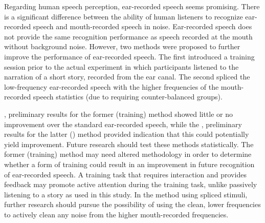 Regarding human speech perception, ear-recorded speech seems promising.  There is a significant difference between the ability of human listeners to recognize ear-recorded speech and mouth-recorded speech in noise.  Ear-recorded speech does not provide the same recognition performance as speech recorded at the mouth without background noise.  However, two methods were proposed to further improve the performance of ear-recorded speech.  The first introduced a training session prior to the actual experiment in which participants listened to the narration of a short story, recorded from the ear canal.  The second spliced the low-frequency ear-recorded speech with the higher frequencies of the mouth-recorded speech \DIFdelbegin {}\DIFdelend \DIFaddbegin {}\DIFaddend statistics (due to requiring counter-balanced groups).  

\DIFdelbegin {}\DIFdelend \DIFaddbegin {}\DIFaddend , preliminary results for the former (training) method showed little or no improvement over the standard ear-recorded speech, while the \DIFdelbegin {}\DIFdelend \DIFaddbegin {}\DIFaddend , preliminary results for the latter (\DIFdelbegin {}\DIFdelend \DIFaddbegin {}\DIFaddend ) method provided indication that this could potentially yield improvement.  Future research should test these methods statistically.  The former (training) method may need altered methodology in order to determine whether a form of training could result in an improvement in future recognition of ear-recorded speech.  A training task that requires interaction and provides feedback may promote active attention during the training task, unlike passively listening to a story as used in this study.  In the method using spliced stimuli, further research should pursue the possibility of using the clean, lower frequencies to actively clean any noise from the higher mouth-recorded frequencies.  

